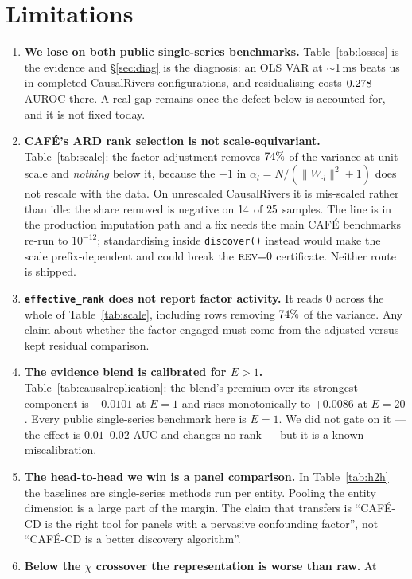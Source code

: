 \documentclass[10pt,twocolumn]{article}
\newcommand{\cafe}{CAF\'E}
\DeclareRobustCommand{\cd}{\cafe{}\nobreakdash-CD}
\begin{document}
\section{Limitations}\label{sec:limits}
\begin{enumerate}
\item \textbf{We lose on both public single-series benchmarks.}
  Table~\ref{tab:losses} is the evidence and \S\ref{sec:diag} is the diagnosis: an OLS
  VAR at $\sim$1\,ms beats us in \LossVarAll{} completed CausalRivers configurations,
  and residualising costs $0.278$ AUROC there. A real gap remains once the defect
  below is accounted for, and it is not fixed today.
\item \textbf{\cafe{}'s ARD rank selection is not scale-equivariant.}
  Table~\ref{tab:scale}: the factor adjustment removes $74\%$ of the variance at
  unit scale and \emph{nothing} below it, because the $+1$ in
  $\alpha_l = N/(\lVert W_{\cdot l}\rVert^2 + 1)$ does not rescale with the data. On
  unrescaled CausalRivers it is mis-scaled rather than idle: the share removed is
  negative on $14$ of $25$ samples. The line is in the production imputation
  path and a fix needs the main \cafe{} benchmarks re-run to $10^{-12}$; standardising
  inside \texttt{discover()} instead would make the scale prefix-dependent and could
  break the $\textsc{rev}{=}0$ certificate. Neither route is shipped.
\item \textbf{\texttt{effective\_rank} does not report factor activity.} It reads $0$
  across the whole of Table~\ref{tab:scale}, including rows removing $74\%$ of the
  variance. Any claim about whether the factor engaged must come from the
  adjusted-versus-kept residual comparison.
\item \textbf{The evidence blend is calibrated for $E>1$.}
  Table~\ref{tab:causalreplication}: the blend's premium over its strongest component is
  $-0.0101$ at $E{=}1$ and rises monotonically to $+0.0086$ at $E{=}20$. Every public
  single-series benchmark here is $E{=}1$. We did not gate on it --- the effect is
  $0.01$--$0.02$ AUC and changes no rank --- but it is a known miscalibration.
\item \textbf{The head-to-head we win is a panel comparison.} In
  Table~\ref{tab:h2h} the baselines are single-series methods run per entity. Pooling
  the entity dimension is a large part of the margin. The claim that transfers is
  ``\cd{} is the right tool for panels with a pervasive confounding factor'', not
  ``\cd{} is a better discovery algorithm''.
\item \textbf{Below the $\chi$ crossover the representation is worse than raw.} At

\end{enumerate}
\end{document}
